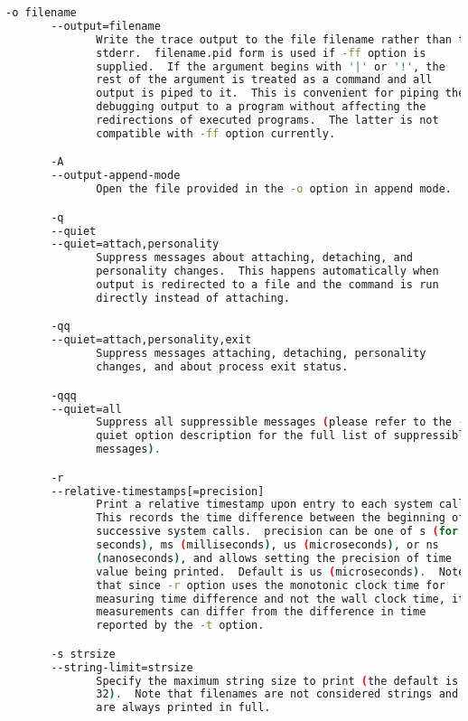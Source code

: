 {{\begin{lstlisting}[language=bash]
       -o filename
       --output=filename
              Write the trace output to the file filename rather than to
              stderr.  filename.pid form is used if -ff option is
              supplied.  If the argument begins with '|' or '!', the
              rest of the argument is treated as a command and all
              output is piped to it.  This is convenient for piping the
              debugging output to a program without affecting the
              redirections of executed programs.  The latter is not
              compatible with -ff option currently.

       -A
       --output-append-mode
              Open the file provided in the -o option in append mode.

       -q
       --quiet
       --quiet=attach,personality
              Suppress messages about attaching, detaching, and
              personality changes.  This happens automatically when
              output is redirected to a file and the command is run
              directly instead of attaching.

       -qq
       --quiet=attach,personality,exit
              Suppress messages attaching, detaching, personality
              changes, and about process exit status.

       -qqq
       --quiet=all
              Suppress all suppressible messages (please refer to the -e
              quiet option description for the full list of suppressible
              messages).

       -r
       --relative-timestamps[=precision]
              Print a relative timestamp upon entry to each system call.
              This records the time difference between the beginning of
              successive system calls.  precision can be one of s (for
              seconds), ms (milliseconds), us (microseconds), or ns
              (nanoseconds), and allows setting the precision of time
              value being printed.  Default is us (microseconds).  Note
              that since -r option uses the monotonic clock time for
              measuring time difference and not the wall clock time, its
              measurements can differ from the difference in time
              reported by the -t option.

       -s strsize
       --string-limit=strsize
              Specify the maximum string size to print (the default is
              32).  Note that filenames are not considered strings and
              are always printed in full.


\end{lstlisting}}}
